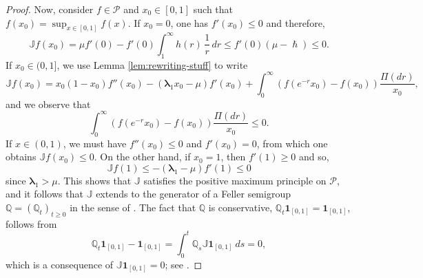 \documentclass[10pt]{amsart}
\theoremstyle{plain}
\theoremstyle{definition}
\newcommand{\Poly}{\mathscr{P}}
\newcommand{\J}{\mathds{Q}}
\newcommand{\calJ}{\mathds{J}}
\newcommand{\lam}{{\bm{\lambda}_1}}
\let\h\hslash
\let\mo\mu
\begin{document}
\begin{proof}
Now, consider $f \in \Poly$ and $x_0 \in [0,1]$ such that $f(x_0)=\sup_{x\in [0,1]} f(x)$.
If $x_0 = 0$, one has $f'(x_0) \le 0$ and therefore,
\[
\calJ f(x_0) = \mo f'(0) - f'(0) \int_1^{\infty} h(r)\,\frac{1}{r}\, dr \le f'(0) (\mo - \h) \le 0.
\]
If $x_0 \in (0,1]$, we use Lemma \ref{lem:rewriting-stuff} to write\vspace*{-3pt}
\[
\calJ f(x_0) = x_0 (1-x_0)f''(x_0)-\left(\lam x_0-\mo\right)f'(x_0)+\int_{0}^{\infty}\left(f(e^{-r}x_0)-f(x_0)\right) \frac{\Pi(dr)}{x_0},
\]
and we observe that\vspace*{-3pt}
\begin{equation*}
\int_{0}^{\infty} \left(f(e^{-r}x_0)-f(x_0)\right) \frac{\Pi(dr)}{x_0} \leq 0.
\end{equation*}
If $x \in (0,1)$, we must have $f''(x_0)\leq 0$ and $f'(x_0)=0$, from which one obtains $\calJ f(x_0)\leq 0$. On the other hand, if $x_0=1$, then $f'(1)\geq 0$ and so,
\[
\calJ f(1)\leq -\left(\lam-\mo \right)f'(1) \leq 0
\]
since $\lam > \mo$.
This shows that $\calJ$ satisfies the positive maximum principle on $\Poly$, and it follows that $\calJ$ extends to the generator of a Feller semigroup $\J = (\J_t)_{t \geq 0}$ in the sense of \cite[Th.\,1.30]{Levy-Matters-III}. The fact that $\J$ is conservative, \ie $\J_t \bm{1}_{[0,1]} = \bm{1}_{[0,1]}$, follows from
\begin{equation*}
\J_t \bm{1}_{[0,1]} - \bm{1}_{[0,1]} = \int_0^t \J_s \calJ \bm{1}_{[0,1]} \: ds = 0,
\end{equation*}
which is a consequence of $\calJ \bm{1}_{[0,1]} = 0$;
see \eg \cite[Lem.\,1.26]{Levy-Matters-III}.
\end{proof}
\end{document}
